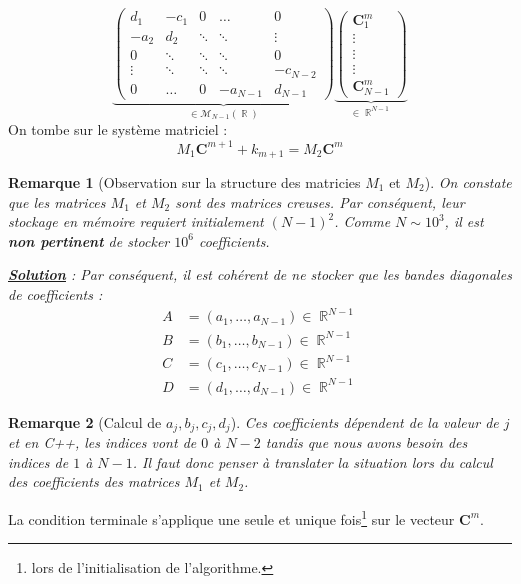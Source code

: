 \documentclass[11pt,a4paper]{article}
\newcommand*{\C}[2]{\mathbf{C}^{#1}_{#2}}
\theoremstyle{plain}
\newtheorem{rmq}{Remarque}
\DeclareMathOperator{\R}{\mathbb{R}}
\begin{document}
$$
\underbrace{\begin{pmatrix}
d_1 & -c_1 & 0 & \dots & 0  \\
-a_2 & d_2 & \ddots  & \ddots & \vdots  \\
0 & \ddots &\ddots  &\ddots  & 0  \\
\vdots & \ddots & \ddots &\ddots  & -c_{N - 2} \\
0 & \dots  & 0  & -a_{N - 1} & d_{N - 1} 
\end{pmatrix}}_{\in \mathcal{M}_{N - 1}(\R)}
\underbrace{\begin{pmatrix}
\C{m}{1} \\
\vdots \\
\vdots \\
\vdots \\
\C{m}{N - 1}
\end{pmatrix}}_{\in \R^{N - 1}}
$$
On tombe sur le système matriciel :
$$\boxed{M_1\C{m + 1}{} + k_{m + 1} = M_2\C{m}{}}$$

\begin{rmq}[Observation sur la structure des matricies $M_1$ et $M_2$]
On constate que les matrices $M_1$ et $M_2$ sont des matrices creuses. Par conséquent, leur stockage en mémoire requiert initialement $(N - 1)^2$. Comme $N \sim 10^3$, il est \textbf{non pertinent} de stocker $10^6$ coefficients.

\textbf{\underline{Solution}} : Par conséquent, il est cohérent de ne stocker que les bandes diagonales de coefficients :
\begin{align*}
    A &= (a_1, \ldots, a_{N - 1}) \in \R^{N - 1} \\
    B &= (b_1, \ldots, b_{N - 1}) \in \R^{N - 1} \\
    C &= (c_1, \ldots, c_{N - 1}) \in \R^{N - 1} \\
    D &= (d_1, \ldots, d_{N - 1}) \in \R^{N - 1}
\end{align*}
\end{rmq}

\begin{rmq}[Calcul de $a_j, b_j, c_j, d_j$]
Ces coefficients dépendent de la valeur de $j$ et en C++, les indices vont de $0$ à $N -2$ tandis que nous avons besoin des indices de $1$ à $N - 1$. Il faut donc penser à translater la situation lors du calcul des coefficients des matrices $M_1$ et $M_2$. 
\end{rmq}
La condition terminale s'applique une seule et unique fois\footnote{lors de l'initialisation de l'algorithme.} sur le vecteur $\C{m}{}$.
\end{document}
